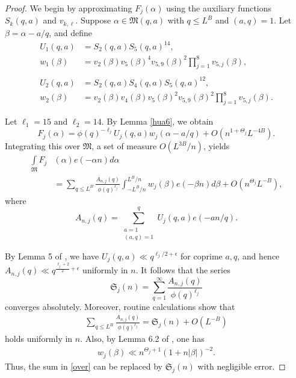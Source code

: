 \documentclass{article}
\theoremstyle{plain}
\begin{document}
\begin{proof}
    We begin by approximating $F_j(\alpha)$ using the auxiliary functions $S_k(q,a)$ and $v_{k,\ell}$. Suppose $\alpha \in \mathfrak{M}(q,a)$ with $q \leq L^B$ and $(a,q)=1$. Let $\beta = \alpha - a/q$, and define 
    \begin{align*}
        U_1(q,a)&=S_2(q,a)S_5(q,a)^{14},\\
        w_1(\beta)&=v_{2}(\beta)v_{5}(\beta)^4v_{5,9}(\beta)^2\prod_{j=1}^{8}v_{5,j}(\beta),\\
        \\
        U_2(q,a)&=S_2(q,a)S_4(q,a)S_5(q,a)^{12},\\
        w_2(\beta)&=v_{2}(\beta)v_{4}(\beta)v_{5}(\beta)^2v_{5,9}(\beta)^2\prod_{j=1}^{8}v_{5,j}(\beta).
    \end{align*}
   
    Let $\ell_1=15$ and $\ell_2=14$. By Lemma \ref{hua6}, we obtain 
    $$F_j(\alpha) =  \phi(q)^{-\ell_j}U_j(q,a)w_j(\alpha - a/q) + O(n^{1+\Theta_j}L^{-4B}).$$
    Integrating this over $\mathfrak{M}$, a set of measure $O(L^{3B}/n)$, yields
    \begin{align}
         \int \limits_{\mathfrak{M}}F_j&(\alpha)e(-\alpha n) d\alpha \nonumber \\&= \sum \limits_{q \leq L^B}\frac{A_{n,j}(q)}{\phi(q)^{\ell_j}} \int_{-L^B/n}^{L^B/n} w_j(\beta)e(-\beta n)d\beta + O(n^{\Theta_j} L^{-B}), \label{over}
     \end{align} 
     where 
     $$A_{n,j}(q) = \sum \limits_{\substack{a=1 \\ (a,q)=1}}^{q} U_j(q,a)e(-an/q).$$
     
    By Lemma 5 of \cite{Hua38}, we have $U_j(q,a) \ll q^{\ell_j/2 + \epsilon}$ for coprime $a,q$, and hence $A_{n,j}(q) \ll q^{\frac{\ell_j+2}{2}+\epsilon}$ uniformly in $n$. It follows that the series 
    $$ \mathfrak{S}_j(n) = \sum \limits_{q =1}^{\infty}\frac{A_{n,j}(q)}{\phi(q)^{\ell_j}}$$ 
    converges absolutely. Moreover, routine calculations show that 
    \begin{align*}
        \sum \limits_{q \leq L^B}\frac{A_{n,j}(q)}{\phi(q)^{\ell_j}} = \mathfrak{S}_j(n) + O(L^{-B})
    \end{align*}
    holds uniformly in $n$. Also, by Lemma 6.2 of \cite{bookVau}, one has
    \begin{align}\label{wcestimate}
        w_j(\beta) \ll n^{\Theta_j +1}(1+n|\beta|)^{-2}.
    \end{align}
    Thus, the sum in \eqref{over} can be replaced by $\mathfrak{S}_j(n)$ with negligible error. 


\end{proof}
\end{document}
